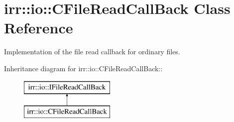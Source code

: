 \hypertarget{classirr_1_1io_1_1_c_file_read_call_back}{
\section{irr::io::CFileReadCallBack Class Reference}
\label{classirr_1_1io_1_1_c_file_read_call_back}
}
Implementation of the file read callback for ordinary files.  


Inheritance diagram for irr::io::CFileReadCallBack::\begin{figure}[H]
\begin{center}
\leavevmode
\includegraphics[height=2cm]{classirr_1_1io_1_1_c_file_read_call_back}
\end{center}
\end{figure}

